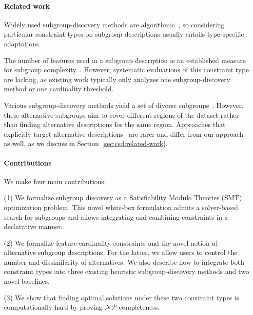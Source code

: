 \documentclass[acmsmall]{acmart} %
\theoremstyle{acmplain}
\theoremstyle{acmdefinition}
\begin{document}
\paragraph{Related work}

Widely used subgroup-discovery methods are algorithmic~\cite{atzmueller2015subgroup, herrera2011overview}, so considering particular constraint types on subgroup descriptions usually entails type-specific adaptations.

The number of features used in a subgroup description is an established measure for subgroup complexity~\cite{helal2016subgroup, herrera2011overview, ventura2018subgroup}.
However, systematic evaluations of this constraint type are lacking, as existing work typically only analyzes one subgroup-discovery method or one cardinality threshold.

Various subgroup-discovery methods yield a set of diverse subgroups~\cite{belfodil2019fssd, bosc2018anytime, leeuwen2012diverse, lucas2018ssdp+}.
However, these alternative subgroups aim to cover different regions of the dataset rather than finding alternative descriptions for the same region.
Approaches that explicitly target alternative descriptions~\cite{boley2009non, galbrun2017redescription, lopez2023discovering, leeuwen2012diverse} are rarer and differ from our approach as well, as we discuss in Section~\ref{sec:csd:related-work}.

\paragraph{Contributions}

We make four main contributions:

(1) We formalize subgroup discovery as a Satisfiability Modulo Theories (SMT) optimization problem.
This novel white-box formulation admits a solver-based search for subgroups and allows integrating and combining constraints in a declarative manner.

(2) We formalize feature-cardinality constraints and the novel notion of alternative subgroup descriptions.
For the latter, we allow users to control the number and dissimilarity of alternatives.
We also describe how to integrate both constraint types into three existing heuristic subgroup-discovery methods and two novel baselines.

(3) We show that finding optimal solutions under these two constraint types is computationally hard by proving $\mathcal{NP}$-completeness.
\end{document}
